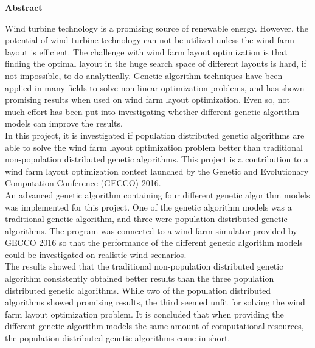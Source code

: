 \begin{center}
\textbf{Abstract}
\end{center}    

\noindent Wind turbine technology is a promising source of renewable energy. However, the potential of wind turbine technology can not be utilized unless the wind farm layout is efficient. The challenge with wind farm layout optimization is that finding the optimal layout in the huge search space of different layouts is hard, if not impossible, to do analytically. Genetic algorithm techniques have been applied in many fields to solve non-linear optimization problems, and has shown promising results when used on wind farm layout optimization. Even so, not much effort has been put into investigating whether different genetic algorithm models can improve the results.\\

\noindent In this project, it is investigated if population distributed genetic algorithms are able to solve the wind farm layout optimization problem better than traditional non-population distributed genetic algorithms. This project is a contribution to a wind farm layout optimization contest launched by the Genetic and Evolutionary Computation Conference (GECCO) 2016.\\

\noindent An advanced genetic algorithm containing four different genetic algorithm models was implemented for this project. One of the genetic algorithm models was a traditional genetic algorithm, and three were population distributed genetic algorithms. The program was connected to a wind farm simulator provided by GECCO 2016 so that the performance of the different genetic algorithm models could be investigated on realistic wind scenarios.\\

\noindent The results showed that the traditional non-population distributed genetic algorithm consistently obtained better results than the three population distributed genetic algorithms. While two of the population distributed algorithms showed promising results, the third seemed unfit for solving the wind farm layout optimization problem. It is concluded that when providing the different genetic algorithm models the same amount of computational resources, the population distributed genetic algorithms come in short.\\
 